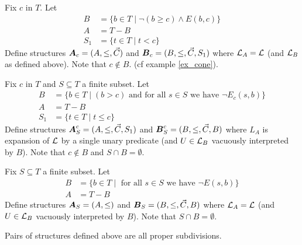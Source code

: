 \documentclass{amsart}
\DeclareMathOperator{\A}{\boldface A}
\DeclareMathOperator{\B}{\boldface B}
\begin{document}
\begin{Definition}
	Fix $c$ in $T$. Let
	\begin{align*}
		B &= \{b \in T \mid \neg(b \geq c) \wedge E(b,c)\} \\
		A &= T - B \\
		S_1 &= \{t \in T \mid t < c\}
	\end{align*}
	Define structures $\A_{c} = (A, \leq, \vec C)$ and $\B_{c} = (B, \leq, \vec C, S_1)$ where $\mathcal L_A = \mathcal L$ (and $\mathcal L_B$ as defined above). Note that $c \notin B$. (cf example \ref{ex_cone}).
\end{Definition}

\begin{Definition}
	Fix $c$ in $T$ and $S \subseteq T$ a finite subset. Let
	\begin{align*}
		B &= \{b \in T \mid (b > c) \text{ and for all $s \in S$ we have } \neg E_c(s, b)\} \\
		A &= T - B \\
		S_1 &= \{t \in T \mid t \leq c\}
	\end{align*}
	Define structures $\A^{c}_{S} = (A, \leq, \vec C, S_1)$ and $\B^{c}_{S} = (B, \leq, \vec C, B)$ where $L_A$ is expansion of $\mathcal L$ by a single unary predicate (and $U \in \mathcal L_B$ vacuously interpreted by $B$). Note that $c \notin B$ and $S \cap B = \emptyset$.
\end{Definition}

\begin{Definition}
	Fix $S \subseteq T$ a finite subset. Let
	\begin{align*}
		B &= \{b \in T \mid \text{ for all $s \in S$ we have } \neg E(s, b)\} \\
		A &= T - B
	\end{align*}
	Define structures $\A_{S} = (A, \leq)$ and $\B_{S} = (B, \leq, \vec C, B)$ where $\mathcal L_A = \mathcal L$ (and $U \in \mathcal L_B$ vacuously interpreted by $B$). Note that $S \cap B = \emptyset$.
\end{Definition}

\begin{Lemma}
	Pairs of structures defined above are all proper subdivisions.
\end{Lemma}
\end{document}
